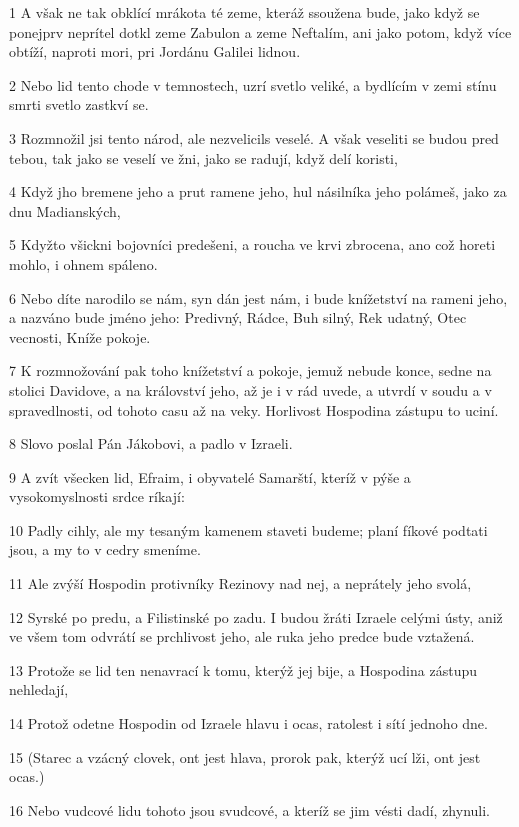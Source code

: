 \par 1 A však ne tak obklící mrákota té zeme, kteráž ssoužena bude, jako když se ponejprv neprítel dotkl zeme Zabulon a zeme Neftalím, ani jako potom, když více obtíží, naproti mori, pri Jordánu Galilei lidnou.
\par 2 Nebo lid tento chode v temnostech, uzrí svetlo veliké, a bydlícím v zemi stínu smrti svetlo zastkví se.
\par 3 Rozmnožil jsi tento národ, ale nezvelicils veselé. A však veseliti se budou pred tebou, tak jako se veselí ve žni, jako se radují, když delí koristi,
\par 4 Když jho bremene jeho a prut ramene jeho, hul násilníka jeho polámeš, jako za dnu Madianských,
\par 5 Kdyžto všickni bojovníci predešeni, a roucha ve krvi zbrocena, ano což horeti mohlo, i ohnem spáleno.
\par 6 Nebo díte narodilo se nám, syn dán jest nám, i bude knížetství na rameni jeho, a nazváno bude jméno jeho: Predivný, Rádce, Buh silný, Rek udatný, Otec vecnosti, Kníže pokoje.
\par 7 K rozmnožování pak toho knížetství a pokoje, jemuž nebude konce, sedne na stolici Davidove, a na království jeho, až je i v rád uvede, a utvrdí v soudu a v spravedlnosti, od tohoto casu až na veky. Horlivost Hospodina zástupu to uciní.
\par 8 Slovo poslal Pán Jákobovi, a padlo v Izraeli.
\par 9 A zvít všecken lid, Efraim, i obyvatelé Samarští, kteríž v pýše a vysokomyslnosti srdce ríkají:
\par 10 Padly cihly, ale my tesaným kamenem staveti budeme; planí fíkové podtati jsou, a my to v cedry smeníme.
\par 11 Ale zvýší Hospodin protivníky Rezinovy nad nej, a neprátely jeho svolá,
\par 12 Syrské po predu, a Filistinské po zadu. I budou žráti Izraele celými ústy, aniž ve všem tom odvrátí se prchlivost jeho, ale ruka jeho predce bude vztažená.
\par 13 Protože se lid ten nenavrací k tomu, kterýž jej bije, a Hospodina zástupu nehledají,
\par 14 Protož odetne Hospodin od Izraele hlavu i ocas, ratolest i sítí jednoho dne.
\par 15 (Starec a vzácný clovek, ont jest hlava, prorok pak, kterýž ucí lži, ont jest ocas.)
\par 16 Nebo vudcové lidu tohoto jsou svudcové, a kteríž se jim vésti dadí, zhynuli.
